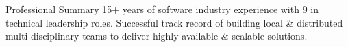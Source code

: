 \documentclass{resume} %
\begin{document}
\vspace{1em}

\begin{rSection}{Professional Summary}
  15+ years of software industry experience with 9 in technical leadership roles. Successful track record of building local \& distributed multi-disciplinary teams to deliver highly available \& scalable solutions.


\end{rSection}

\end{document}
